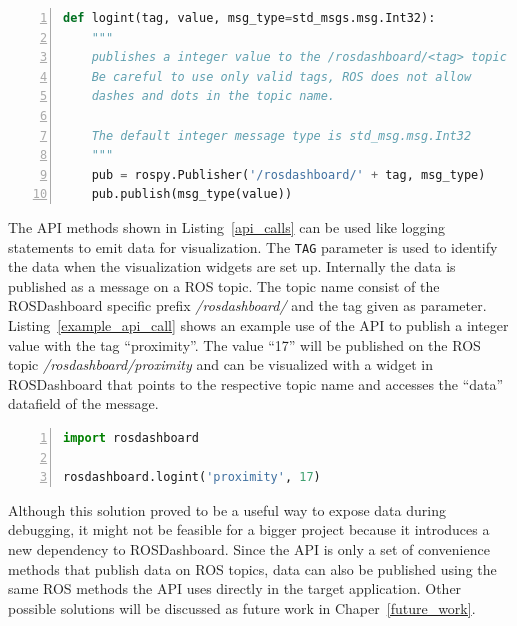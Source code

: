 \begin{lstlisting}[float,frame=single,caption={Implemented logint API method.},label=api_implementation,language=Python,numbers=left,breaklines=true]
def logint(tag, value, msg_type=std_msgs.msg.Int32):
    """
    publishes a integer value to the /rosdashboard/<tag> topic
    Be careful to use only valid tags, ROS does not allow
    dashes and dots in the topic name.
    
    The default integer message type is std_msg.msg.Int32
    """
    pub = rospy.Publisher('/rosdashboard/' + tag, msg_type)
    pub.publish(msg_type(value))
\end{lstlisting}

The API methods shown in Listing~\ref{api_calls} can be used like logging statements to emit data for visualization. The \verb+TAG+ parameter is used to identify the data when the visualization widgets are set up. Internally the data is published as a message on a ROS topic. The topic name consist of the ROSDashboard specific prefix \emph{/rosdashboard/} and the tag given as parameter. Listing~\ref{example_api_call} shows an example use of the API to publish a integer value with the tag ``proximity''. The value ``17'' will be published on the ROS topic \emph{/rosdashboard/proximity} and can be visualized with a widget in ROSDashboard that points to the respective topic name and accesses the ``data'' datafield of the message.


\begin{lstlisting}[frame=single,caption={Example API usage.},label=example_api_call,language=Python,numbers=left,breaklines=true]
import rosdashboard

rosdashboard.logint('proximity', 17)
\end{lstlisting}

Although this solution proved to be a useful way to expose data during debugging, it might not be feasible for a bigger project because it introduces a new dependency to ROSDashboard. Since the API is only a set of convenience methods that publish data on ROS topics, data can also be published using the same ROS methods the API uses directly in the target application. Other possible solutions will be discussed as future work in Chaper~\ref{future_work}.

